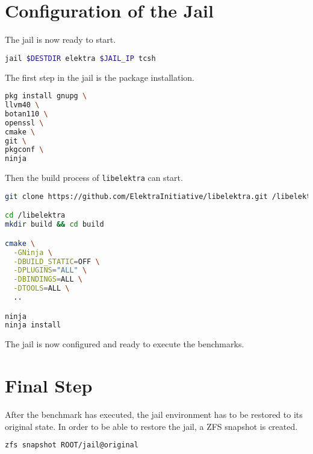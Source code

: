 \section*{Configuration of the Jail}

The jail is now ready to start.

\begin{lstlisting}[language=bash]
jail $DESTDIR elektra $JAIL_IP tcsh
\end{lstlisting}

The first step in the jail is the package installation.

\begin{lstlisting}[language=bash]
pkg install gnupg \
llvm40 \
botan110 \
openssl \
cmake \
git \
pkgconf \
ninja
\end{lstlisting}

Then the build process of \texttt{libelektra} can start.

\begin{lstlisting}[language=bash]
git clone https://github.com/ElektraInitiative/libelektra.git /libelektra

cd /libelektra
mkdir build && cd build

cmake \
  -GNinja \
  -DBUILD_STATIC=OFF \
  -DPLUGINS="ALL" \
  -DBINDINGS=ALL \
  -DTOOLS=ALL \
  ..

ninja
ninja install
\end{lstlisting}

The jail is now configured and ready to execute the benchmarks.

\section*{Final Step}

After the benchmark has executed, the jail environment has to be restored to its original state.
In order to be able to restore the jail, a ZFS snapshot is created.

\begin{lstlisting}[language=bash]
zfs snapshot ROOT/jail@original
\end{lstlisting}
